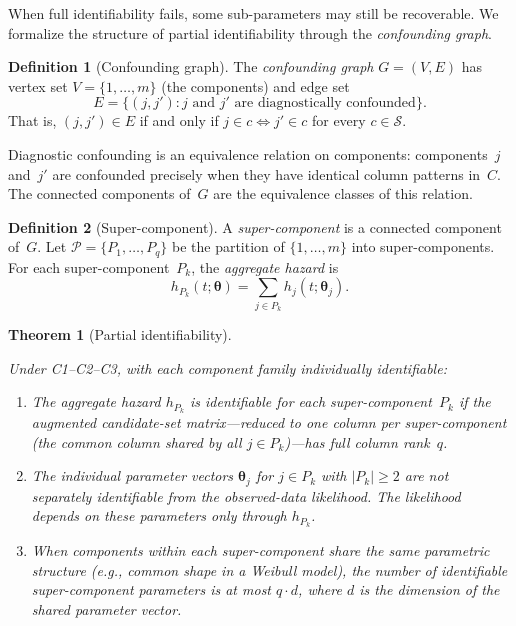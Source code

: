 \documentclass[11pt]{article}
\theoremstyle{definition}
\newtheorem{definition}{Definition}
\theoremstyle{plain}
\newtheorem{theorem}{Theorem}
\renewcommand{\v}[1]{\boldsymbol{#1}}
\begin{document}
When full identifiability fails, some sub-parameters may still be
recoverable.  We formalize the structure of partial identifiability
through the \emph{confounding graph}.

\begin{definition}[Confounding graph]
\label{def:confounding-graph}
The \emph{confounding graph} $G = (V, E)$ has vertex set
$V = \{1, \ldots, m\}$ (the components) and edge set
\begin{equation}
    E = \bigl\{(j, j') : j \text{ and } j' \text{ are diagnostically
    confounded}\bigr\}.
\end{equation}
That is, $(j, j') \in E$ if and only if $j \in c \iff j' \in c$
for every $c \in \mathcal{S}$.
\end{definition}

Diagnostic confounding is an equivalence relation on components:
components~$j$ and~$j'$ are confounded precisely when they have
identical column patterns in~$C$.  The connected components of~$G$ are
the equivalence classes of this relation.

\begin{definition}[Super-component]
\label{def:super-component}
A \emph{super-component} is a connected component of~$G$.
Let $\mathcal{P} = \{P_1, \ldots, P_q\}$ be the partition
of $\{1, \ldots, m\}$ into super-components.
For each super-component~$P_k$, the \emph{aggregate hazard} is
\begin{equation}
    h_{P_k}(t; \v{\theta}) = \sum_{j \in P_k} h_j(t; \v{\theta}_j).
\end{equation}
\end{definition}

\begin{theorem}[Partial identifiability]
\label{thm:partial-identifiability}
\begin{sloppypar}%
Under C1--C2--C3, with each component family individually
identifiable:
\begin{enumerate}
    \item[\emph{(a)}] The aggregate hazard $h_{P_k}$
    is identifiable for each super-component~$P_k$ if the
    augmented candidate-set matrix---reduced to one column per
    super-component (the common column shared by all
    $j \in P_k$)---has full column rank~$q$.
    \item[\emph{(b)}] The individual parameter vectors
    $\v{\theta}_j$ for $j \in P_k$ with $|P_k| \geq 2$ are not
    separately identifiable from the observed-data likelihood.
    The likelihood depends on these parameters only through
    $h_{P_k}$.
    \item[\emph{(c)}] When components within each super-component
    share the same parametric structure (e.g., common shape in a
    Weibull model), the number of identifiable super-component
    parameters is at most $q \cdot d$, where $d$ is the dimension of
    the shared parameter vector.
\end{enumerate}%
\end{sloppypar}
\end{theorem}
\end{document}
